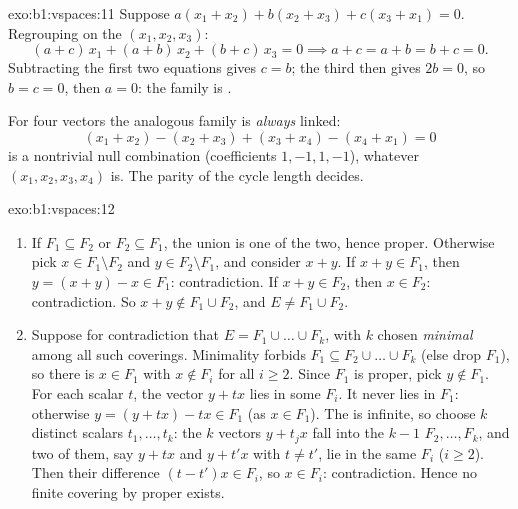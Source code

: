 \begin{solution}{exo:b1:vspaces:11}
Suppose $a(x_1 + x_2) + b(x_2 + x_3) + c(x_3 + x_1) = 0$.
Regrouping on the  $(x_1, x_2, x_3)$:
\[
(a + c)\,x_1 + (a + b)\,x_2 + (b + c)\,x_3 = 0
\implies a + c = a + b = b + c = 0 .
\]
Subtracting the first two equations gives $c = b$; the third then
gives $2b = 0$, so $b = c = 0$, then $a = 0$: the family is .

For four vectors the analogous family is \emph{always} linked:
\[
(x_1 + x_2) - (x_2 + x_3) + (x_3 + x_4) - (x_4 + x_1) = 0
\]
is a nontrivial null combination (coefficients $1, -1, 1, -1$),
whatever $(x_1, x_2, x_3, x_4)$ is. The parity of the cycle length
decides.
\end{solution}

\begin{solution}{exo:b1:vspaces:12}
\begin{enumerate}
  \item If $F_1 \subseteq F_2$ or $F_2 \subseteq F_1$, the union
        is one of the two, hence proper. Otherwise pick $x \in F_1
        \setminus F_2$ and $y \in F_2 \setminus F_1$, and consider
        $x + y$. If $x + y \in F_1$, then $y = (x + y) - x \in
        F_1$: contradiction. If $x + y \in F_2$, then $x \in F_2$:
        contradiction. So $x + y \notin F_1 \cup F_2$, and $E \neq
        F_1 \cup F_2$.
  \item Suppose for contradiction that $E = F_1 \cup \dots \cup
        F_k$, with $k$ chosen \emph{minimal} among all such
        coverings. Minimality forbids $F_1 \subseteq F_2 \cup
        \dots \cup F_k$ (else drop $F_1$), so there is $x \in F_1$
        with $x \notin F_i$ for all $i \geq 2$. Since $F_1$ is
        proper, pick $y \notin F_1$. For each scalar $t$, the
        vector $y + t x$ lies in some $F_i$. It never lies in
        $F_1$: otherwise $y = (y + tx) - tx \in F_1$ (as $x \in
        F_1$). The  is infinite, so choose $k$ distinct
        scalars $t_1, \dots, t_k$: the $k$ vectors $y + t_j x$
        fall into the $k - 1$  $F_2, \dots, F_k$, and two
        of them, say $y + t x$ and $y + t' x$ with $t \neq t'$,
        lie in the same $F_i$ ($i \geq 2$). Then their difference
        $(t - t')x \in F_i$, so $x \in F_i$: contradiction. Hence
        no finite covering by proper  exists.
\end{enumerate}
\end{solution}

